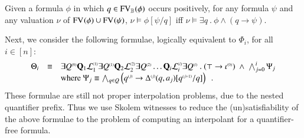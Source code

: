 \documentclass{llncs}
\begin{document}
\begin{proposition}\label{prop:substitution}
  Given a formula $\phi$ in which $q \in \mathrm{FV}_{\mathbb{B}}(\phi)$ occurs
  positively, for any formula $\psi$ and any valuation $\nu$ of
  $\mathrm{FV}_{}(\phi) \cup \mathrm{FV}_{}(\psi)$, \(\nu \models \phi[\psi/q]\) iff
  \(\nu \models \exists q ~.~ \phi \wedge (q \rightarrow \psi)\).
\end{proposition}
Next, we consider the following formulae, logically equivalent to
$\Phi_i$, for all $i \in [n]$:
\[\begin{array}{rcl} 
\Theta_i & \equiv & \mathbf{\exists} {Q}^{\scriptscriptstyle{({0})}} \mathbf{Q}_1
{\mathcal{L}}^{\scriptscriptstyle{({1})}}_1 \mathbf{\exists} {Q}^{\scriptscriptstyle{({1})}} \mathbf{Q}_2
{\mathcal{L}}^{\scriptscriptstyle{({2})}}_2 \mathbf{\exists} {Q}^{\scriptscriptstyle{({2})}} \ldots
\mathbf{Q}_i {\mathcal{L}}^{\scriptscriptstyle{({i})}}_i \mathbf{\exists} {Q}^{\scriptscriptstyle{({i})}} 
~.~ (\top \rightarrow {\iota}^{\scriptscriptstyle{({0})}}) ~\wedge~ \bigwedge_{j=0}^i \Psi_j \\
&& \text{where } \Psi_j \equiv \bigwedge_{q \in Q} \left({q}^{\scriptscriptstyle{({j})}} \rightarrow
{\Delta}^{\scriptscriptstyle{({j})}}(q,a_j)[{q}^{\scriptscriptstyle{({j+1})}}/q]\right)\enspace.
\end{array}\] These formulae are
still not proper interpolation problems, due to the nested quantifier
prefix. Thus we use Skolem witnesses to reduce the (un)satisfiability
of the above formulae to the problem of computing an interpolant for a
quantifier-free formula.
\end{document}
